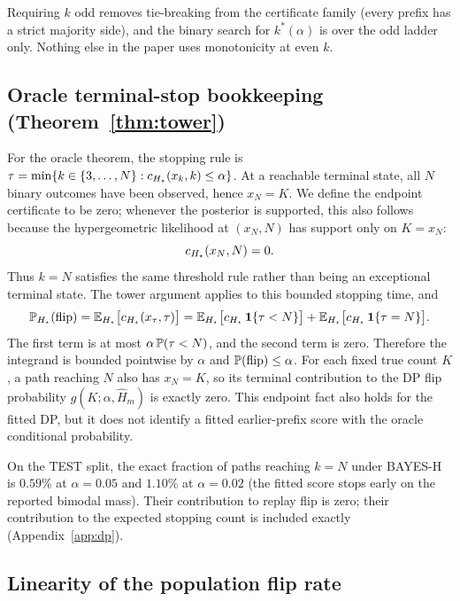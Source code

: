 \begin{remark}
Requiring $k$ odd removes tie-breaking from the certificate family
(every prefix has a strict majority side), and the binary search for
$k^*(\alpha)$ is over the odd ladder only. Nothing else in the paper uses
monotonicity at even $k$.
\end{remark}

\subsection{Oracle terminal-stop bookkeeping (Theorem~\ref{thm:tower})}

For the oracle theorem, the stopping rule is
$\tau=\min\{k\in\{3,\ldots,N\}:\oraclecert(x_k,k)\le\alpha\}$.  At a reachable
terminal state, all $N$ binary outcomes have been observed, hence $x_N=K$.
We define the endpoint certificate to be zero; whenever the posterior is
supported, this also follows because the hypergeometric likelihood at
$(x_N,N)$ has support only on $K=x_N$:
\[
\oraclecert(x_N,N)=0.
\]
Thus $k=N$ satisfies the same threshold rule rather than being an exceptional
terminal state. The tower argument applies to this bounded stopping time,
and
\[
\P_{\trueH}(\flip)=\E_{\trueH}\big[\oraclecert(x_\tau,\tau)\big]
=\E_{\trueH}\big[\oraclecert\,\mathbf 1\{\tau<N\}\big]+\E_{\trueH}\big[\oraclecert\,\mathbf 1\{\tau=N\}\big].
\]
The first term is at most $\alpha\,\P(\tau<N)$, and the second term is zero.
Therefore the integrand is bounded pointwise by $\alpha$ and
$\P(\flip)\le\alpha$.  For each fixed true count $K$, a path reaching $N$
also has $x_N=K$, so its terminal contribution to the DP flip probability
$g(K;\alpha,\widehat H_m)$ is exactly zero. This endpoint fact also holds
for the fitted DP, but it does not identify a fitted earlier-prefix score with
the oracle conditional probability.

\begin{remark}
On the TEST split, the exact fraction of paths reaching $k=N$ under
BAYES-H is $0.59\%$ at $\alpha=0.05$ and $1.10\%$ at $\alpha=0.02$ (the
fitted score stops early on the reported bimodal mass). Their contribution to
replay flip is zero; their contribution to the expected stopping count is
included exactly (Appendix~\ref{app:dp}).
\end{remark}

\subsection{Linearity of the population flip rate}

